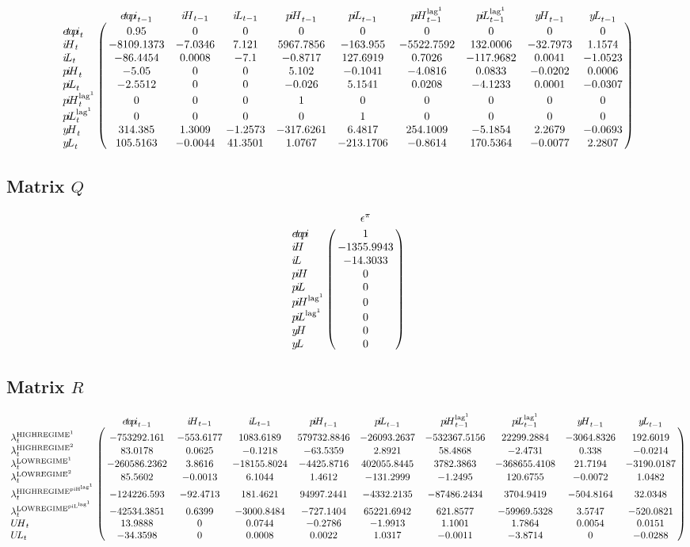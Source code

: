 $$\bordermatrix{
~ & {e\!t\!a\!p\!i}_{t-1} & {i\!H}_{t-1} & {i\!L}_{t-1} & {p\!i\!H}_{t-1} & {p\!i\!L}_{t-1} & {p\!i\!H}^{\mathrm{lag}^{\mathrm{1}}}_{t-1} & {p\!i\!L}^{\mathrm{lag}^{\mathrm{1}}}_{t-1} & {y\!H}_{t-1} & {y\!L}_{t-1} \cr
{e\!t\!a\!p\!i}_{t} & 0.95 & 0 & 0 & 0 & 0 & 0 & 0 & 0 & 0 \cr
{i\!H}_{t} & -8109.1373 & -7.0346 & 7.121 & 5967.7856 & -163.955 & -5522.7592 & 132.0006 & -32.7973 & 1.1574 \cr
{i\!L}_{t} & -86.4454 & 0.0008 & -7.1 & -0.8717 & 127.6919 & 0.7026 & -117.9682 & 0.0041 & -1.0523 \cr
{p\!i\!H}_{t} & -5.05 & 0 & 0 & 5.102 & -0.1041 & -4.0816 & 0.0833 & -0.0202 & 0.0006 \cr
{p\!i\!L}_{t} & -2.5512 & 0 & 0 & -0.026 & 5.1541 & 0.0208 & -4.1233 & 0.0001 & -0.0307 \cr
{p\!i\!H}^{\mathrm{lag}^{\mathrm{1}}}_{t} & 0 & 0 & 0 & 1 & 0 & 0 & 0 & 0 & 0 \cr
{p\!i\!L}^{\mathrm{lag}^{\mathrm{1}}}_{t} & 0 & 0 & 0 & 0 & 1 & 0 & 0 & 0 & 0 \cr
{y\!H}_{t} & 314.385 & 1.3009 & -1.2573 & -317.6261 & 6.4817 & 254.1009 & -5.1854 & 2.2679 & -0.0693 \cr
{y\!L}_{t} & 105.5163 & -0.0044 & 41.3501 & 1.0767 & -213.1706 & -0.8614 & 170.5364 & -0.0077 & 2.2807 \cr
}$$

\subsection*{Matrix $Q$}

$$\bordermatrix{
~ & \epsilon^{\pi} \cr
{e\!t\!a\!p\!i} & 1 \cr
{i\!H} & -1355.9943 \cr
{i\!L} & -14.3033 \cr
{p\!i\!H} & 0 \cr
{p\!i\!L} & 0 \cr
{p\!i\!H}^{\mathrm{lag}^{\mathrm{1}}} & 0 \cr
{p\!i\!L}^{\mathrm{lag}^{\mathrm{1}}} & 0 \cr
{y\!H} & 0 \cr
{y\!L} & 0 \cr
}$$

\subsection*{Matrix $R$}

$$\bordermatrix{
~ & {e\!t\!a\!p\!i}_{t-1} & {i\!H}_{t-1} & {i\!L}_{t-1} & {p\!i\!H}_{t-1} & {p\!i\!L}_{t-1} & {p\!i\!H}^{\mathrm{lag}^{\mathrm{1}}}_{t-1} & {p\!i\!L}^{\mathrm{lag}^{\mathrm{1}}}_{t-1} & {y\!H}_{t-1} & {y\!L}_{t-1} \cr
\lambda^{\mathrm{HIGHREGIME}^{\mathrm{1}}}_{t} & -753292.161 & -553.6177 & 1083.6189 & 579732.8846 & -26093.2637 & -532367.5156 & 22299.2884 & -3064.8326 & 192.6019 \cr
\lambda^{\mathrm{HIGHREGIME}^{\mathrm{2}}}_{t} & 83.0178 & 0.0625 & -0.1218 & -63.5359 & 2.8921 & 58.4868 & -2.4731 & 0.338 & -0.0214 \cr
\lambda^{\mathrm{LOWREGIME}^{\mathrm{1}}}_{t} & -260586.2362 & 3.8616 & -18155.8024 & -4425.8716 & 402055.8445 & 3782.3863 & -368655.4108 & 21.7194 & -3190.0187 \cr
\lambda^{\mathrm{LOWREGIME}^{\mathrm{2}}}_{t} & 85.5602 & -0.0013 & 6.1044 & 1.4612 & -131.2999 & -1.2495 & 120.6755 & -0.0072 & 1.0482 \cr
\lambda^{\mathrm{HIGHREGIME}^{\mathrm{piH}^{\mathrm{lag}^{\mathrm{1}}}}}_{t} & -124226.593 & -92.4713 & 181.4621 & 94997.2441 & -4332.2135 & -87486.2434 & 3704.9419 & -504.8164 & 32.0348 \cr
\lambda^{\mathrm{LOWREGIME}^{\mathrm{piL}^{\mathrm{lag}^{\mathrm{1}}}}}_{t} & -42534.3851 & 0.6399 & -3000.8484 & -727.1404 & 65221.6942 & 621.8577 & -59969.5328 & 3.5747 & -520.0821 \cr
{U\!H}_{t} & 13.9888 & 0 & 0.0744 & -0.2786 & -1.9913 & 1.1001 & 1.7864 & 0.0054 & 0.0151 \cr
{U\!L}_{t} & -34.3598 & 0 & 0.0008 & 0.0022 & 1.0317 & -0.0011 & -3.8714 & 0 & -0.0288 \cr
}$$

